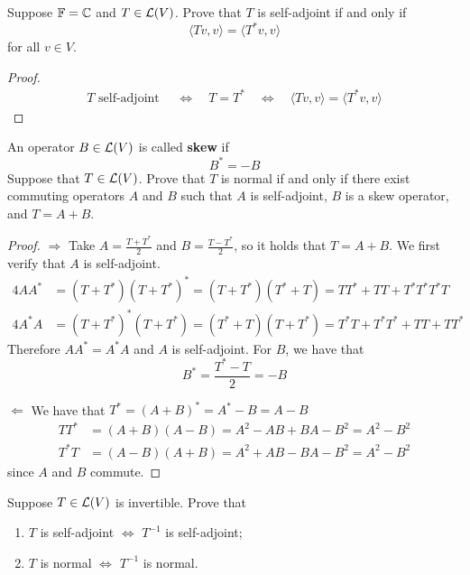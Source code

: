\documentclass{extarticle}
\begin{document}
\begin{problem}{10}
    Suppose \(\mathbb{F} = \mathbb{C}\) and \(T \in \mathcal{L}(V)\). Prove that \(T\) is self-adjoint if and only if 
    \[\langle Tv,v \rangle = \langle T^* v,v \rangle\]
    for all \(v \in V\).
\end{problem}

\begin{proof}
\begin{align*}
    T \text{ self-adjoint } \quad \Longleftrightarrow \quad 
    T = T^* \quad \Longleftrightarrow \quad 
    \langle Tv,v \rangle = \langle T^*v,v \rangle
\end{align*}
\end{proof}

\begin{problem}{12}
    An operator \(B \in \mathcal{L}(V)\) is called \textbf{skew} if 
    \[B^* = - B\]
    Suppose that \(T \in \mathcal{L}(V)\). Prove that \(T\) is normal if and only if there exist commuting 
    operators \(A\) and \(B\) such that \(A\) is self-adjoint, \(B\) is a skew operator, and 
    \(T = A + B\).
\end{problem}

\begin{proof}
\(\Rightarrow\) Take \(A = \frac{T + T^*}{2}\) and \(B = \frac{T - T^*}{2}\), so it holds that 
\(T = A + B\). We first verify that \(A\) is self-adjoint. 
\begin{align*}
    4AA^* &= (T + T^*)(T + T^*)^* = (T + T^*)(T^* + T) = TT^* + TT + T^*T^* T^*T\\ 
    4A^*A &= (T + T^*)^* (T + T^*) = (T^* + T) (T + T^*) = T^*T + T^*T^* + TT + TT^*
\end{align*}
Therefore \(AA^* = A^*A\) and \(A\) is self-adjoint. For \(B\), we have that 
\[B^* = \frac{T^* - T}{2} = - B\]

\(\Leftarrow\) We have that \(T^* = (A+B)^* = A^* - B = A - B\)
\begin{align*}
    TT^* &= (A+B)(A-B) = A^2 - AB + BA - B^2 = A^2 - B^2 \\ 
    T^*T &= (A - B)(A + B) = A^2 + AB - BA - B^2 = A^2 - B^2
\end{align*}
since \(A\) and \(B\) commute. 
\end{proof}

\begin{problem}{15}
    Suppose \(T \in \mathcal{L}(V)\) is invertible. Prove that 
    \begin{enumerate}[label=(\alph*)]
        \item \(T\) is self-adjoint \(\Longleftrightarrow\) \(T^{-1}\) is self-adjoint; 
        \item \(T\) is normal \(\Longleftrightarrow\) \(T^{-1}\) is normal.
    \end{enumerate}
\end{problem}
\end{document}
